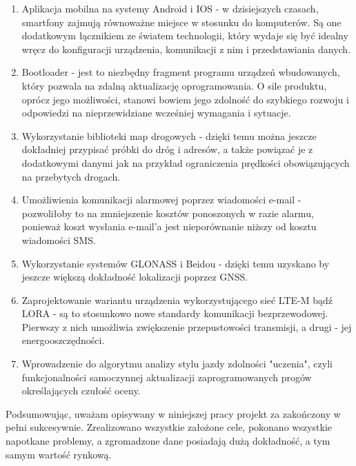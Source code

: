 \begin{enumerate}
\item Aplikacja mobilna na systemy Android i IOS - w dzisiejszych czasach, smartfony zajmują równoważne miejsce w stosunku do komputerów. Są one dodatkowym łącznikiem ze światem technologii, który wydaje się być idealny wręcz do konfiguracji urządzenia, komunikacji z nim i przedstawiania danych.
\item Bootloader - jest to niezbędny fragment programu urządzeń wbudowanych, który pozwala na zdalną aktualizację oprogramowania. O sile produktu, oprócz jego możliwości, stanowi bowiem jego zdolność do szybkiego rozwoju i odpowiedzi na nieprzewidziane wcześniej wymagania i sytuacje.
\item Wykorzystanie biblioteki map drogowych - dzięki temu można jeszcze dokładniej przypisać próbki do dróg i adresów, a także powiązać je z dodatkowymi danymi jak na przykład ograniczenia prędkości obowiązujących na przebytych drogach.
\item Umożliwienia komunikacji alarmowej poprzez wiadomości e-mail - pozwoliłoby to na zmniejszenie kosztów ponoszonych w razie alarmu, ponieważ koszt wysłania e-mail'a jest nieporównanie niższy od kosztu wiadomości SMS.
\item Wykorzystanie systemów GLONASS i Beidou - dzięki temu uzyskano by jeszcze większą dokładność lokalizacji poprzez GNSS.
\item Zaprojektowanie wariantu urządzenia wykorzystującego sieć LTE-M bądź LORA - są to stosunkowo nowe standardy komunikacji bezprzewodowej. Pierwszy z nich umożliwia zwiększenie przepustowości transmisji, a drugi - jej energooszczędności.
\item Wprowadzenie do algorytmu analizy stylu jazdy zdolności "uczenia", czyli funkcjonalności samoczynnej aktualizacji zaprogramowanych progów określających czułość oceny.
\end{enumerate} 

Podsumowując, uważam opisywany w niniejszej pracy projekt za zakończony w pełni sukcesywnie. Zrealizowano wszystkie założone cele, pokonano wszystkie napotkane problemy, a zgromadzone dane posiadają dużą dokładność, a tym samym wartość rynkową. 